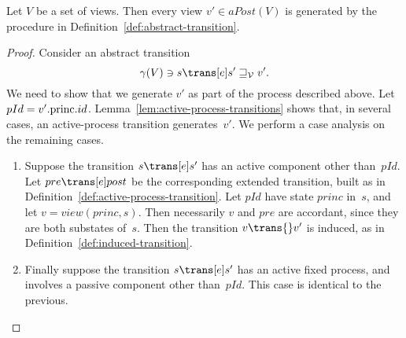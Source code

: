 
\begin{prop}
\label{prop:abstract-transitions-sound}
Let $V$ be a set of views.  Then every view $v' \in aPost(V)$ is
generated by the procedure in Definition~\ref{def:abstract-transition}.
\end{prop}

\begin{proof} 
Consider an abstract transition
\[
\gamma(V) \ni s \trans[e] s' \sqge_{\V} v'.
\]
We need to show that we generate $v'$ as part of the process described above.
%
Let $pId = v'.\mathrm{princ}.id$.
%
Lemma~\ref{lem:active-process-transitions} shows that, in several cases, an
active-process transition generates~$v'$. 
%
We perform a case analysis on the remaining cases.
%
\begin{enumerate}

\item
Suppose the transition $s \trans[e] s'$ has an active component other
than~$pId$.  Let $pre \trans[e] post$ be the corresponding extended
transition, built as in Definition~\ref{def:active-process-transition}.  Let
$pId$ have state $princ$ in~$s$, and let
$v = view(princ, s)$.  Then necessarily $v$ and $pre$ are accordant, since
they are both substates of~$s$.  Then the transition $v \trans{} v'$ is
induced, as in Definition~\ref{def:induced-transition}.

\item\label{step:abs-trans-correct-3}
Finally suppose the transition $s \trans[e] s'$ has an active fixed process,
and involves a passive component other than~$pId$.  This case is identical to
the previous.
\end{enumerate}
\end{proof}

